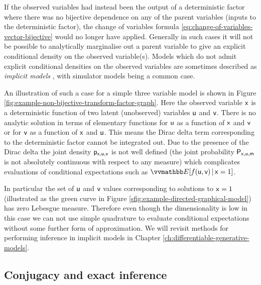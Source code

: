 If the observed variables had instead been the output of a deterministic factor where there was no bijective dependence on any of the parent variables (inputs to the deterministic factor), the change of variables formula \eqref{eq:change-of-variables-vector-bijective} would no longer have applied. Generally in such cases it will not be possible to analytically marginalise out a parent variable to give an explicit conditional density on the observed variable(s). Models which do not admit explicit conditional densities on the observed variables are sometimes described as \emph{implicit models} \citep{diggle1984monte}, with simulator models being a common case.

An illustration of such a case for a simple three variable model is shown in Figure \ref{fig:example-non-bijective-transform-factor-graph}. Here the observed variable $\mathsf{x}$ is a deterministic function of two latent (unobserved) variables $\mathsf{u}$ and $\mathsf{v}$. There is no analytic solution in terms of elementary functions for $\mathsf{u}$ as a function of $\mathsf{x}$ and $\mathsf{v}$ or for $\mathsf{v}$ as a function of $\mathsf{x}$ and $\mathsf{u}$. This means the Dirac delta term corresponding to the deterministic factor cannot be integrated out. Due to the presence of the Dirac delta the joint density $\mathsf{p}_{\mathsf{x},\mathsf{u},\mathsf{v}}$ is not well defined (the joint probability $\mathsf{P}_{\mathsf{x},\mathsf{u},\mathsf{m}}$ is not absolutely continuous with respect to any measure) which complicates evaluations of conditional expectations such as $\expc{f(\rvar{u},\rvar{v}) \gvn \rvar{x} = 1}$. 

In particular the set of $\mathsf{u}$ and $\mathsf{v}$ values corresponding to solutions to $\mathsf{x} = 1$ (illustrated as the green curve in Figure \ref{sfig:example-directed-graphical-model}) has zero Lebesgue measure. Therefore even though the dimensionality is low in this case we can not use simple quadrature to evaluate conditional expectations without some further form of approximation. We will revisit methods for performing inference in implicit models in Chapter \ref{ch:differentiable-generative-models}.

\subsection{Conjugacy and exact inference}\label{subsec:conjugacy-and-exact-inference}

